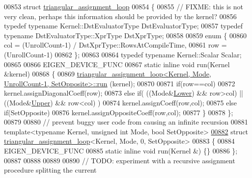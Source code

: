 \begin{DoxyCode}
00853 \textcolor{keyword}{struct }\hyperlink{struct_eigen_1_1internal_1_1triangular__assignment__loop}{triangular\_assignment\_loop}
00854 \{
00855   \textcolor{comment}{// FIXME: this is not very clean, perhaps this information should be provided by the kernel?}
00856   \textcolor{keyword}{typedef} \textcolor{keyword}{typename} Kernel::DstEvaluatorType DstEvaluatorType;
00857   \textcolor{keyword}{typedef} \textcolor{keyword}{typename} DstEvaluatorType::XprType DstXprType;
00858   
00859   \textcolor{keyword}{enum} \{
00860     col = (UnrollCount-1) / DstXprType::RowsAtCompileTime,
00861     row = (UnrollCount-1) %
00862   \};
00863   
00864   \textcolor{keyword}{typedef} \textcolor{keyword}{typename} Kernel::Scalar Scalar;
00865 
00866   EIGEN\_DEVICE\_FUNC
00867   \textcolor{keyword}{static} \textcolor{keyword}{inline} \textcolor{keywordtype}{void} run(Kernel &kernel)
00868   \{
00869     \hyperlink{struct_eigen_1_1internal_1_1triangular__assignment__loop}{triangular\_assignment\_loop<Kernel, Mode, UnrollCount-1, SetOpposite>::run}
      (kernel);
00870     
00871     \textcolor{keywordflow}{if}(row==col)
00872       kernel.assignDiagonalCoeff(row);
00873     \textcolor{keywordflow}{else} \textcolor{keywordflow}{if}( ((Mode&\hyperlink{group__enums_gga39e3366ff5554d731e7dc8bb642f83cda891792b8ed394f7607ab16dd716f60e6}{Lower}) && row>col) || ((Mode&\hyperlink{group__enums_gga39e3366ff5554d731e7dc8bb642f83cda6bcb58be3b8b8ec84859ce0c5ac0aaec}{Upper}) && row<col) )
00874       kernel.assignCoeff(row,col);
00875     \textcolor{keywordflow}{else} \textcolor{keywordflow}{if}(SetOpposite)
00876       kernel.assignOppositeCoeff(row,col);
00877   \}
00878 \};
00879 
00880 \textcolor{comment}{// prevent buggy user code from causing an infinite recursion}
00881 \textcolor{keyword}{template}<\textcolor{keyword}{typename} Kernel, \textcolor{keywordtype}{unsigned} \textcolor{keywordtype}{int} Mode, \textcolor{keywordtype}{bool} SetOpposite>
\hyperlink{struct_eigen_1_1internal_1_1triangular__assignment__loop_3_01_kernel_00_01_mode_00_010_00_01_set_opposite_01_4}{00882} \textcolor{keyword}{struct }\hyperlink{struct_eigen_1_1internal_1_1triangular__assignment__loop}{triangular\_assignment\_loop}<Kernel, Mode, 0, SetOpposite>
00883 \{
00884   EIGEN\_DEVICE\_FUNC
00885   \textcolor{keyword}{static} \textcolor{keyword}{inline} \textcolor{keywordtype}{void} run(Kernel &) \{\}
00886 \};
00887 
00888 
00889 
00890 \textcolor{comment}{// TODO: experiment with a recursive assignment procedure splitting the current}

\end{DoxyCode}
